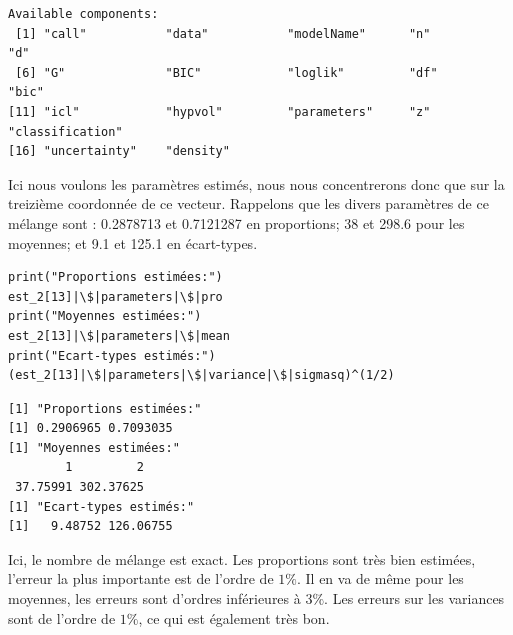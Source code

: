 \documentclass[frenchb]{report}
\newcommand{\1}{\mathbbm{1}}
\theoremstyle{definition}\newtheorem{defn}{Définition}
\theoremstyle{definition}\newtheorem{exm}{Exemple}
\theoremstyle{definition}\newtheorem{nota}{Notation}
\theoremstyle{definition}\newtheorem{rem}{Remarque}
\begin{document}
\begin{appendices}
\begin{verbatim}
Available components: 
 [1] "call"           "data"           "modelName"      "n"              "d"             
 [6] "G"              "BIC"            "loglik"         "df"             "bic"           
[11] "icl"            "hypvol"         "parameters"     "z"              "classification"
[16] "uncertainty"    "density"
\end{verbatim}
%
Ici nous voulons les paramètres estimés, nous nous concentrerons donc que sur la treizième coordonnée de ce vecteur.\newline
Rappelons que les divers paramètres de ce mélange sont : 0.2878713 et 0.7121287 en proportions; 38 et 298.6 pour les moyennes; et 9.1 et 125.1 en écart-types.
\begin{lstlisting}
print("Proportions estimées:")
est_2[13]|\$|parameters|\$|pro
print("Moyennes estimées:")
est_2[13]|\$|parameters|\$|mean
print("Ecart-types estimés:")
(est_2[13]|\$|parameters|\$|variance|\$|sigmasq)^(1/2)
\end{lstlisting}
\begin{verbatim}
[1] "Proportions estimées:"
[1] 0.2906965 0.7093035
[1] "Moyennes estimées:"
        1         2 
 37.75991 302.37625 
[1] "Ecart-types estimés:"
[1]   9.48752 126.06755
\end{verbatim}
Ici, le nombre de mélange est exact. Les proportions sont très bien estimées, l'erreur la plus importante est de l'ordre de $1\%$. Il en va de même pour les moyennes, les erreurs sont d'ordres inférieures à $3\%$. Les erreurs sur les variances sont de l'ordre de $1\%$, ce qui est également très bon.
\newpage

\end{appendices}
\end{document}
